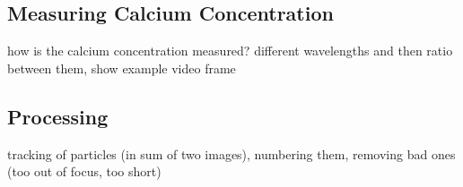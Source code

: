 \subsection{Measuring Calcium Concentration}

how is the calcium concentration measured? different wavelengths and then ratio between them, show example video frame

\subsection{Processing}

tracking of particles (in sum of two images), numbering them, removing bad ones (too out of focus, too short)
